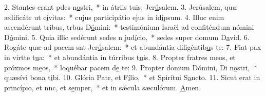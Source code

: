 2. Stantes erant pdes n\uline{o}stri,~* in átriis tuis, Jer\uline{ú}salem.
3. Jerúsalem, quæ ædificátr ut c\uline{í}vitas:~* cujus participátio ejus in id\uline{í}psum.
4. Illuc enim ascendérunt tribus, trbus D\uline{ó}mini:~* testimónium Israël ad confiténdum nómini D\uline{ó}mini.
5. Quia illic sedérunt sedes n jud\uline{í}cio,~* sedes super domum D\uline{a}vid.
6. Rogáte quæ ad pacem snt Jer\uline{ú}salem:~* et abundántia diligéntib\uline{u}s te:
7. Fiat pax in virtte t\uline{u}a:~* et abundántia in túrribus t\uline{u}is.
8. Propter fratres meos, et próxmos m\uline{e}os,~* loquébar pacem d\uline{e} te:
9. Propter domum Dómini, Di n\uline{o}stri,~* quæsívi bona t\uline{i}bi.
10. Glória Patr, et F\uline{í}lio,~* et Spirítui S\uline{a}ncto.
11. Sicut erat in princípio, et nnc, et s\uline{e}mper,~* et in sǽcula sæculórum. \uline{A}men.
